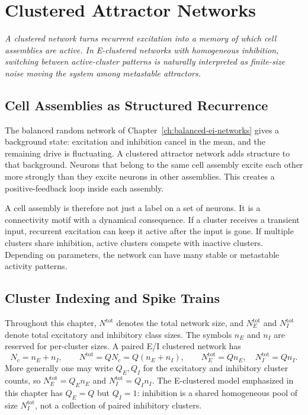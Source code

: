 \chapter{Clustered Attractor Networks}
\label{ch:clustered-attractor-networks}

\textit{A clustered network turns recurrent excitation into a memory of which
cell assemblies are active. In E-clustered networks with homogeneous
inhibition, switching between active-cluster patterns is naturally interpreted
as finite-size noise moving the system among metastable attractors.}

\section{Cell Assemblies as Structured Recurrence}
\label{sec:cell-assemblies}

The balanced random network of Chapter~\ref{ch:balanced-ei-networks} gives a
background state: excitation and inhibition cancel in the mean, and the
remaining drive is fluctuating. A clustered attractor network adds structure to
that background. Neurons that belong to the same cell assembly excite each
other more strongly than they excite neurons in other assemblies. This creates a
positive-feedback loop inside each assembly.

A cell assembly is therefore not just a label on a set of neurons. It is a
connectivity motif with a dynamical consequence. If a cluster receives a
transient input, recurrent excitation can keep it active after the input is gone.
If multiple clusters share inhibition, active clusters compete with inactive
clusters. Depending on parameters, the network can have many stable or
metastable activity patterns.

\section{Cluster Indexing and Spike Trains}
\label{sec:cluster-indexing}

Throughout this chapter, $N^{\mathrm{tot}}$ denotes the total network size, and
$N_E^{\mathrm{tot}}$ and $N_I^{\mathrm{tot}}$ denote total excitatory and
inhibitory class sizes. The symbols $n_E$ and $n_I$ are reserved for
per-cluster sizes. A paired E/I clustered network has
%
\begin{equation}
  N_c=n_E+n_I,
  \qquad
  N^{\mathrm{tot}}=Q N_c=Q(n_E+n_I),
  \qquad
  N_E^{\mathrm{tot}}=Q n_E,\quad N_I^{\mathrm{tot}}=Q n_I .
  \label{eq:ch05-paired-size-convention}
\end{equation}
%
More generally one may write $Q_E,Q_I$ for the excitatory and inhibitory
cluster counts, so
$N_E^{\mathrm{tot}}=Q_E n_E$ and
$N_I^{\mathrm{tot}}=Q_I n_I$. The E-clustered model emphasized in this chapter
has $Q_E=Q$ but $Q_I=1$: inhibition is a shared homogeneous pool of size
$N_I^{\mathrm{tot}}$, not a collection of paired inhibitory clusters.

